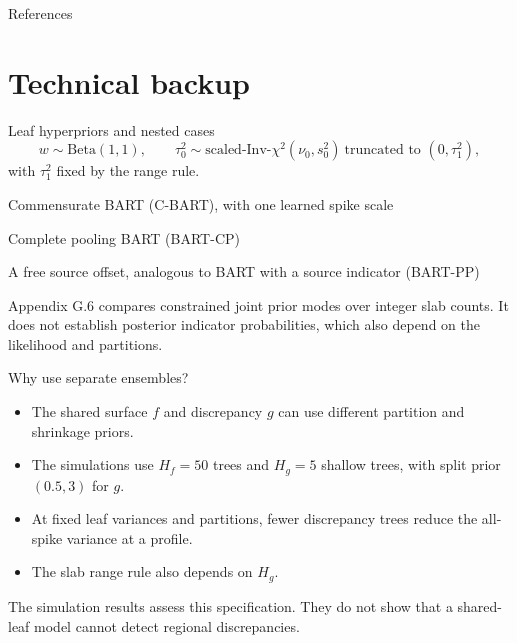 \documentclass[11pt,aspectratio=169]{beamer}
\newcommand{\key}[1]{{\color{AccentBlue}\textbf{#1}}}
\newcommand{\sectionframe}[1]{%
  \begin{frame}[plain]
    \vspace*{0.46\paperheight}
    \hspace*{0.65cm}{\LARGE\bfseries #1}
  \end{frame}}
\begin{document}
\begin{frame}[allowframebreaks]{References}
  \fontsize{7pt}{8pt}\selectfont
  
  
\end{frame}

\appendix
\section{Technical backup}
\sectionframe{Technical backup}

\begin{frame}{Leaf hyperpriors and nested cases}
  \small
  \[
    w\sim\mathrm{Beta}(1,1),\qquad
    \tau_0^2\sim\text{scaled-Inv-}\chi^2(\nu_0,s_0^2)
    \ \text{truncated to }(0,\tau_1^2),
  \]
  with $\tau_1^2$ fixed by the range rule.

  \vspace{0.7em}
  \begin{description}\setlength\itemsep{0.6em}
    \item[\key{\(w=1\)}] Commensurate BART (C-BART), with one learned spike scale
    \item[\key{\(w=1,\tau_0^2\to0\)}] Complete pooling BART (BART-CP)
    \item[\key{\(w=0\)}] A free source offset, analogous to BART with a source indicator (BART-PP)
  \end{description}

  \vfill
  {\scriptsize Appendix G.6 compares constrained joint prior modes over integer slab counts. It does not establish posterior indicator probabilities, which also depend on the likelihood and partitions.}
\end{frame}

\begin{frame}{Why use separate ensembles?}
  \large
  \begin{itemize}\setlength\itemsep{0.75em}
    \item The shared surface $f$ and discrepancy $g$ can use different partition and shrinkage priors.
    \item The simulations use $H_f=50$ trees and $H_g=5$ shallow trees, with split prior $(0.5,3)$ for $g$.
    \item At fixed leaf variances and partitions, fewer discrepancy trees reduce the all-spike variance at a profile.
    \item The slab range rule also depends on $H_g$.
  \end{itemize}

  \vfill
  {\small The simulation results assess this specification. They do not show that a shared-leaf model cannot detect regional discrepancies.}
\end{frame}
\end{document}
